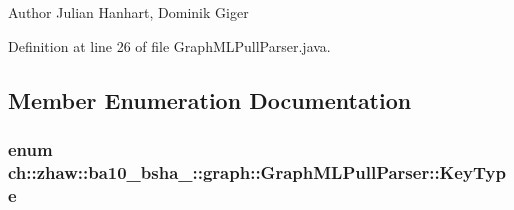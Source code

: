 \begin{DoxyAuthor}{Author}
Julian Hanhart, Dominik Giger 
\end{DoxyAuthor}


Definition at line 26 of file GraphMLPullParser.java.

\subsection{Member Enumeration Documentation}
\hypertarget{classch_1_1zhaw_1_1ba10__bsha__1_1_1graph_1_1GraphMLPullParser_aaa46f90276e81808deff1bae71e7e97a}{
\subsubsection[{KeyType}]{\setlength{\rightskip}{0pt plus 5cm}enum {\bf ch::zhaw::ba10\_\-bsha\_::graph::GraphMLPullParser::KeyType}}}
\label{classch_1_1zhaw_1_1ba10__bsha__1_1_1graph_1_1GraphMLPullParser_aaa46f90276e81808deff1bae71e7e97a}
